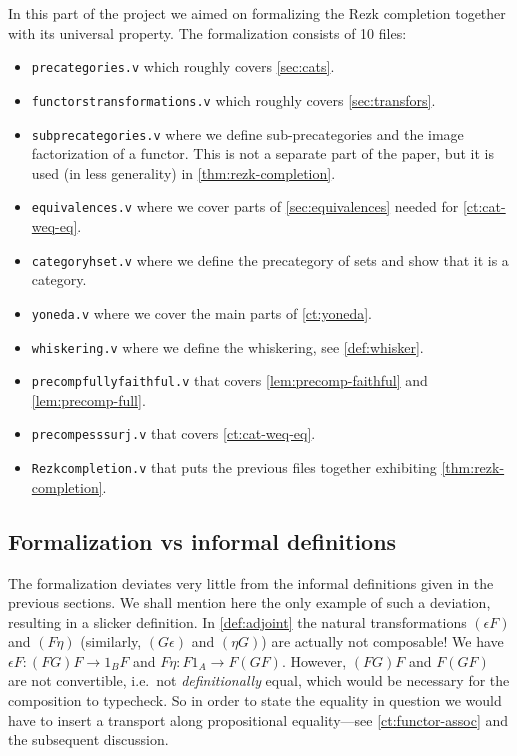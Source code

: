 In this part of the project we aimed on formalizing the Rezk completion together with its universal property. The formalization consists of 10 files:
\begin{itemize}
 \item \texttt{precategories.v} which roughly covers \autoref{sec:cats}.
 \item \texttt{functors\textunderscore transformations.v} which roughly covers \autoref{sec:transfors}.
 \item \texttt{sub\textunderscore precategories.v} where we define sub-precategories and
                 the image factorization of a functor. 
          This is not a separate part of the paper, but it is used (in less generality) in \autoref{thm:rezk-completion}.
 \item \texttt{equivalences.v} where we cover parts of \autoref{sec:equivalences} needed for \autoref{ct:cat-weq-eq}.
 \item \texttt{category\textunderscore hset.v} where we define the precategory of sets and show that it is a category.
 \item \texttt{yoneda.v} where we cover the main parts of \autoref{ct:yoneda}.
 \item \texttt{whiskering.v} where we define the whiskering, see \autoref{def:whisker}.
 \item \texttt{precomp\textunderscore fully\textunderscore faithful.v} that covers \autoref{lem:precomp-faithful} and \ref{lem:precomp-full}.
 \item \texttt{precomp\textunderscore ess\textunderscore surj.v} that covers \autoref{ct:cat-weq-eq}.
 \item \texttt{Rezk\textunderscore completion.v} that puts the previous files together exhibiting \autoref{thm:rezk-completion}.
\end{itemize}






\subsection*{Formalization vs informal definitions}

The formalization deviates very little from the informal definitions given in the previous sections.
We shall mention here the only example of such a deviation, resulting in a slicker definition. 
In \autoref{def:adjoint} the natural transformations $(\epsilon F)$ and $(F\eta)$ (similarly, 
$(G\epsilon)$ and $(\eta G)$) are actually not
composable! We have $\epsilon F : (FG)F \to 1_{B}F$ and $F\eta : F1_A \to F(GF)$. 
However, $(FG)F$ and $F(GF)$ are not convertible, i.e.\ not \emph{definitionally} equal, 
which would be necessary for the composition to typecheck. So in order to state the equality in question
we would have to insert a transport along propositional equality---see \autoref{ct:functor-assoc} and the subsequent discussion.

